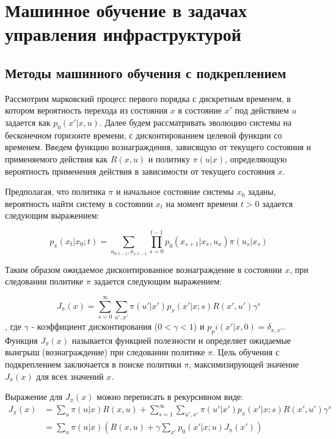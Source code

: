 \section{Машинное обучение в задачах управления инфраструктурой}

\subsection{Методы машинного обучения с подкреплением}

Рассмотрим марковский процесс первого порядка с дискретным временем, в котором  вероятность перехода из состояния $x$ в состояние $x'$ под действием $u$ задается как $p_0(x'|x,u)$.  Далее будем рассматривать эволюцию системы на бесконечном горизонте времени, с дисконтированием целевой функции со временем. Введем функцию вознаграждения, зависящую от текущего состояния и применяемого действия  как $R(x,u)$ и политику $\pi(u|x)$, определяющую вероятность применения действия в зависимости от текущего состояния $x$.

Предполагая, что политика $\pi$ и начальное состояние системы $x_0$ заданы, вероятность найти систему в состоянии $x_t$ на момент времени $t > 0$ задается следующим выражением:

\begin{equation}
    \label{eq:pxxt}
     p_\pi(x_t|x_0; t) =
     \sum_{u_{0:t−1}, x_{1:t−1}}{
     	\prod_{s=0}^{t-1} {
        	p_0(x_{s+1}|x_s, u_x) \pi(u_s|x_s)
         }
      }
\end{equation}

Таким образом ожидаемое дисконтированное вознаграждение в состоянии $x$, при следовании политике $\pi$ задается следующим выражением:

\begin{equation}
    \label{eq:j_pi}
     J_{\pi}(x) =
     \sum_{s=0}^{\infty}
       \sum_{u', x'}{
          \pi(u'|x')p_\pi(x'|x; s)R(x', u')\gamma^s
        }
\end{equation}
, где $\gamma$ - коэффициент дисконтирования ($0 < \gamma < 1$) и $p_pi(x'|x, 0) = \delta_{x,x'}$. Функция $J_\pi(x)$ называется функцией полезности и определяет ожидаемые выигрыш (вознаграждение) при следовании политике $\pi$. Цель обучения с подкреплением заключается в поиске политики $\pi$, максимизирующей значение $J_\pi(x)$ для всех значений $x$.

Выражение для $J_\pi(x)$ можно переписать в рекурсивном виде:
\begin{equation}
    \label{eq:j_pi_rec}
    \begin{split}
     J_\pi(x) &=
     \sum_u {\pi(u|x)R(x,u)} +
     \sum_{s=1}^{\infty}
       \sum_{u', x'}{
          \pi(u'|x')p_\pi(x'|x; s)R(x', u')\gamma^s
        } \\
        &= \sum_u {\pi(u|x)} \left(
        R(x,u) + \gamma \sum_{x'}{
        		p_0(x'|x; u)J_{\pi}(x')
            }
       		\right)
            \end{split}
\end{equation}

